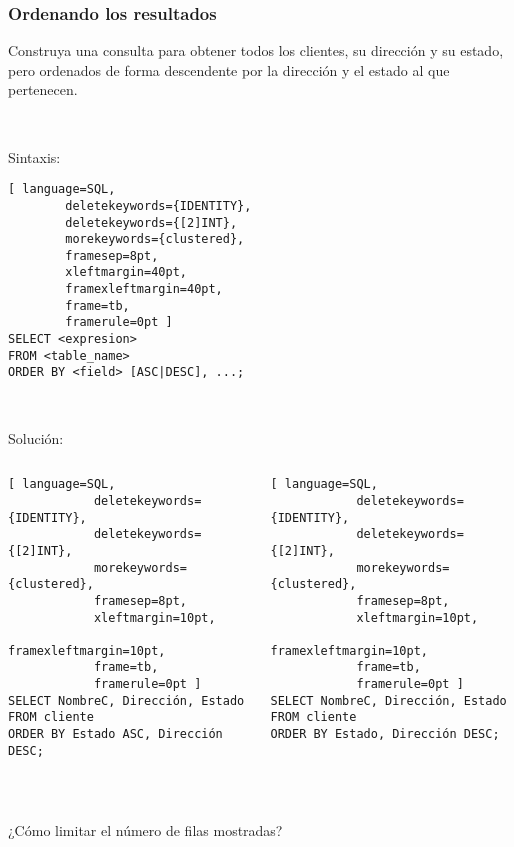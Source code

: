 \begin{frame}[fragile]

	\frametitle{Ordenando los resultados}
	
	Construya una consulta para obtener todos los clientes, su dirección y su estado, pero ordenados de forma descendente por la dirección y el estado al que pertenecen.
	
	\pause
	
	\ 
	
	Sintaxis:
	\begin{lstlisting}[ language=SQL,
		deletekeywords={IDENTITY},
		deletekeywords={[2]INT},
		morekeywords={clustered},
		framesep=8pt,
		xleftmargin=40pt,
		framexleftmargin=40pt,
		frame=tb,
		framerule=0pt ]
SELECT <expresion>
FROM <table_name>
ORDER BY <field> [ASC|DESC], ...;
\end{lstlisting} 

	\pause
	
	\ 
	
	Solución:
	\begin{columns}[t]
		\begin{lstlisting}[ language=SQL,
			deletekeywords={IDENTITY},
			deletekeywords={[2]INT},
			morekeywords={clustered},
			framesep=8pt,
			xleftmargin=10pt,
			framexleftmargin=10pt,
			frame=tb,
			framerule=0pt ]
SELECT NombreC, Dirección, Estado 
FROM cliente 
ORDER BY Estado ASC, Dirección DESC;
\end{lstlisting} 
		
		\begin{lstlisting}[ language=SQL,
			deletekeywords={IDENTITY},
			deletekeywords={[2]INT},
			morekeywords={clustered},
			framesep=8pt,
			xleftmargin=10pt,
			framexleftmargin=10pt,
			frame=tb,
			framerule=0pt ]
SELECT NombreC, Dirección, Estado 
FROM cliente 
ORDER BY Estado, Dirección DESC;
\end{lstlisting} 
		
	\end{columns}
	
	\pause 
	
	\ 
	
	
	\textcolor{codepurple}{¿Cómo limitar el número de filas mostradas?}
	
\end{frame}


